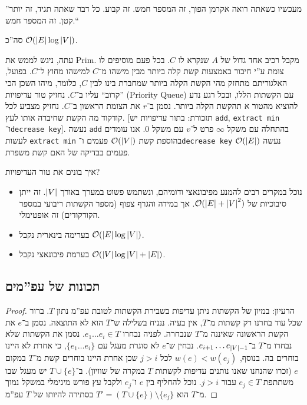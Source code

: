 \documentclass[]{../../../../tex/classes/styledArticle}
\begin{document}
	''מעכשיו כשאתה רואה אקרמן הפוך, זה המספר חמש. זה קבוע. כל דבר שאתה תגיד, זה יותר קטן. זה המספר חמש.``
	
	סה''כ $\mathcal{O}(\left \lvert E \right \rvert \log \left \lvert V \right \rvert)$. 
	
	עתה, ניגש לממש את Prim. מקבל רכיב אחד גדול של $A$ שנקרא לו $C$. בכל פעם מוסיפים לו צומת ע''י חיבור באמצעות קשת קלה ביותר מבין מישהו מ־$C$ למישהו מחוץ ל־$C$. בפועל, האלגוריתם מתחזק מהי הקשת הקלה ביותר שמחברת בינו לבין $C$, כלומר, מיהו השכן הכי ''קרוב`` עליו ב־$C$. נחזיק טור עדיפויות (Priority Queue) עם הקשתות הללו, ובכל רגע נדע להוציא מהטור א תהקשת הקלה ביותר. נסמן ב־$r$ את הצומת הראשון ב־$C$. נחזיק מצביע לכל קודקוד מה הקשת שחיברה אותו לעץ. [תזכורת: בתור עדיפויות יש \texttt{add}, \texttt{extract min} ו־\texttt{decrease key}]. נעשה \texttt{add} בהתחלה עם משקל $\infty$ פרט ל־$v$ עם משקל $0$. אנו עומדים לעשות \texttt{extract min} בהוספת קשת $\mathcal{O}(\left \lvert V \right \rvert)$ פעמים ו־\texttt{decrease key} נעשה $\mathcal{O}(\left \lvert E \right \rvert)$ פעמים בבדיקה של האם קשת משפרת. 
	
	איך בונים את טור העדיפויות? 
	\begin{itemize}
		\item נוכל במקרים רבים להמנע מפיבונאצי ודומיהם, ונשתמש פשוט במערך באורך $\left \lvert V \right \rvert$. זה ייתן סיבוכיות של $\mathcal{O}(\left \lvert E \right \rvert + \left \lvert V \right \rvert^{2})$. אך במידה והגרף צפוף (מספר הקשתות ריבועי במספר הקודקודים) זה אופטימלי. 
		\item בערימה בינארית נקבל $\mathcal{O}(\left \lvert E \right \rvert \log \left \lvert V \right \rvert)$. 
		\item בערמת פיבונאצי נקבל $\mathcal{O}(\left \lvert V \right \rvert \log \left \lvert V \right \rvert+ \left \lvert E \right \rvert)$. 
	\end{itemize}
		
		
	\subsection*{תכונות של עפ''מים}
	\begin{proof}
		הרעיון: במיון של הקשתות ניתן עדיפות בשבירת הקשתות לטובת עפ''מ נתון $T$. ברור שכל עוד בחרנו רק קשתות מ־$T$, אין בעיה. ננניח בשלילה ש־$T$ הוא לא התוצאה. נסמן ב־$e$ את הקשת הראשונה שאיננה מ־$T$ שנבחרה. לפניה נבחרו $e_1 \dots e_i \in T$. נסמן את הקשתות שלא נבחרו מ־$T$ ב־$e_{i + 1} \dots e_{\left \lvert V \right \rvert - 1}$. נבחין ש־$e$ לא סוגרת מעגל עם $\{e_1 \dots e_i\}$, כי אחרת לא היינו בוחרים בה. בנוסף, $w(e) < w(e_j)$ לכל $j > i$ שכן אחרת היינו בוחרים קשת מ־$T$ במקום $e$ (זכרו שהנחנו שאנו נותנים עדיפות לקשתות $T$ במקרה של שוויון). ב־$T \cup \{e\}$ יש מעגל שבו משתתפת $e_j \in T$ עבור $j > i$. נוכל להחליף בין $e$ ו־$e_j$ ולקבל עץ פורש מינימלי במשקל נמוך מ־$T$ הוא $T' = (T \cup \{e\}) \setminus \{e_j\}$ בסתירה להיותו של $T$ עפ''מ. 
	\end{proof}
	
\end{document}
